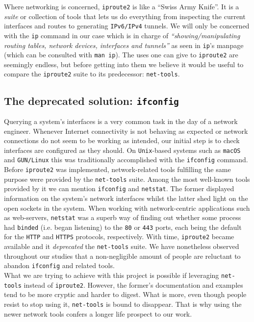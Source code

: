        Where networking is concerned, \texttt{iproute2} is like a ``Swiss Army Knife''. It is a \textit{suite} or collection of tools that lets us do everything from inspecting the current interfaces and routes to generating \texttt{IPv6/IPv4} tunnels. We will only be concerned with the \texttt{ip} command in our case which is in charge of \textit{``showing/manipulating routing tables, network devices, interfaces and tunnels''} as seen in \texttt{ip}'s manpage (which can be consulted with \texttt{man ip}). The uses one can give to \texttt{iproute2} are seemingly endless, but before getting into them we believe it would be useful to compare the \texttt{iproute2} suite to its predecessor: \texttt{net-tools}.\\

        \subsection{The deprecated solution: \texttt{ifconfig}}
            Querying a system's interfaces is a very common task in the day of a network engineer. Whenever Internet connectivity is not behaving as expected or network connections do not seem to be working as intended, our initial step is to check interfaces are configured as they should. On \texttt{Unix}-based systems such as \texttt{macOS} and \texttt{GUN/Linux} this was traditionally accomplished with the \texttt{ifconfig} command. Before \texttt{iproute2} was implemented, network-related tools fulfilling the same purpose were provided by the \texttt{net-tools} suite. Among the most well-known tools provided by it we can mention \texttt{ifconfig} and \texttt{netstat}. The former displayed information on the system's network interfaces whilst the latter shed light on the open sockets in the system. When working with network-centric applications such as web-servers, \texttt{netstat} was a superb way of finding out whether some process had \texttt{binded} (i.e. began listening) to the \texttt{80} or \texttt{443} ports, each being the default for the \texttt{HTTP} and \texttt{HTTPS} protocols, respectively. With time, \texttt{iproute2} became available and it \textit{deprecated} \cite{bib:net-tools-deprecation} the \texttt{net-tools} suite. We have nonetheless observed throughout our studies that a non-negligible amount of people are reluctant to abandon \texttt{ifconfig} and related tools.\\

            What we are trying to achieve with this project is possible if leveraging \texttt{net-tools} instead of \texttt{iproute2}. However, the former's documentation and examples tend to be more cryptic and harder to digest. What is more, even though people resist to stop using it, \texttt{net-tools} is bound to disappear. That is why using the newer network tools confers a longer life prospect to our work.\\

